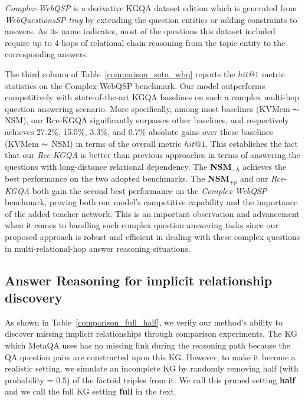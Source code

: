 \documentclass[pdflatex,sn-mathphys]{sn-jnl}%
\theoremstyle{thmstyleone}%
\theoremstyle{thmstyletwo}%
\theoremstyle{thmstylethree}%
\begin{document}
\textit{Complex-WebQSP} \cite{he2021stu-teaQA} is a derivative KGQA dataset edition which is generated from \textit{WebQuestionsSP-tiny} by extending the question entities or adding constraints to answers. As its name indicates, most of the questions this dataset included require up to 4-hops of relational chain reasoning from the topic entity to the corresponding answers.
 
The third column of Table~\ref{comparison_sota_wbq} reports the $hit@1$ metric statistics on the Complex-WebQSP benchmark. Our model outperforms competitively with state-of-the-art KGQA baselines on such a complex multi-hop question answering scenario. More specifically, among most baselines (KVMem $\thicksim$ NSM), our Rce-KGQA significantly surpasses other baselines, and respectively achieves 27.2\%, 15.5\%, 3.3\%, and 0.7\% absolute gains over these baselines (KVMem $\thicksim$ NSM) in terms of the overall metric $hit@1$. This establishes the fact that our \textit{Rce-KGQA} is better than previous approaches in terms of answering the questions with long-distance relational dependency. The \textbf{NSM}$_{+h}$ achieves the best performance on the two adopted benchmarks. The \textbf{NSM}$_{+p}$ and our \textit{Rce-KGQA} both gain the second best performance on the \textit{Complex-WebQSP} benchmark, proving both our model's competitive capability and the importance of the added teacher network. This is an important observation and advancement when it comes to handling such complex question answering tasks since our proposed approach is robust and efficient in dealing with these complex questions in multi-relational-hop answer reasoning situations.


\subsection{Answer Reasoning for implicit relationship discovery}

As shown in Table~\ref{comparison_full_half}, we verify our method's ability to discover missing implicit relationships through comparison experiments. The KG which MetaQA uses has no missing link during the reasoning path because the QA question pairs are constructed upon this KG. However, to make it become a realistic setting, we simulate an incomplete KG by randomly removing half (with probability = 0.5) of the factoid triples from it.  We call this pruned setting \textbf{half} and we call the full KG setting \textbf{full} in the text.  
\end{document}
